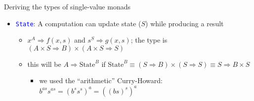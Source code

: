 \documentclass[english]{beamer}
\begin{document}
\begin{frame}{Deriving the types of single-value monads}
\begin{itemize}
\begin{itemize}
this function should have type {\footnotesize{}$A\Rightarrow\text{Cont}^{B}$},
hence{\footnotesize{} $\text{Cont}^{B}\equiv\left(B\Rightarrow1\right)\Rightarrow1$}{\footnotesize \par}
\item generalize to {\footnotesize{}$\text{Cont}^{A}\equiv\left(A\Rightarrow R\right)\Rightarrow R$
}where $R$ is the fixed ``result'' type
\end{itemize}
\item \texttt{\textcolor{blue}{\footnotesize{}State}}: A computation can
update state ($S$) while producing a result
\begin{itemize}
\item $x^{A}\Rightarrow f(x,s)$ and $s^{S}\Rightarrow g(x,s)$; the type
is{\footnotesize{} $\left(A\times S\Rightarrow B\right)\times\left(A\times S\Rightarrow S\right)$}{\footnotesize \par}
\item this will be $A\Rightarrow\text{State}^{B}$ if {\footnotesize{}$\text{State}^{B}\equiv\left(S\Rightarrow B\right)\times\left(S\Rightarrow S\right)\equiv S\Rightarrow B\times S$ }{\footnotesize \par}
\begin{itemize}
\item we used the ``arithmetic'' Curry-Howard: $b^{as}s^{as}=(b^{s}s^{s})^{a}=\left(\left(bs\right)^{s}\right)^{a}$
\end{itemize}
\end{itemize}
\end{itemize}
\end{frame}
\end{document}
